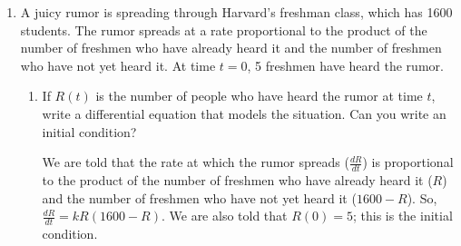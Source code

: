 \documentclass[main]{subfiles}
\begin{document}
\begin{enumerate}[resume]
\begin{enumerate}
  \item
    \begin{problem}[\stretch{1.5}]
      A student who has learned a fifth of the list already is currently
      learning at a rate of 10\% of the list per day.  Incorporate this
      into your model.
    \end{problem}

    \begin{solution}
      At this particular moment, $L = 20$ (the student has learned 20\% of
      the list) and $\frac{dL}{dt} = 10$ (the student is learning at a
      rate of 10\% per day).  If we plug this into the differential
      equation $\frac{dL}{dt} = k(100 - L)$, then we find that $10 = k
      (100 - 20)$, so we are able to solve for $k$: it's $\frac{10}{80} =
      \frac{1}{8}$.  Thus, $\boxed{\frac{dL}{dt} = \frac{1}{8} (100 -
        L)}$.
    \end{solution}

  \end{enumerate}

\item 


  A juicy rumor is spreading through Harvard's freshman class, which
  has 1600 students.  The rumor spreads at a rate proportional to the
  product of the number of freshmen who have already heard it and the
  number of freshmen who have not yet heard it.  At time $t = 0$, 5
  freshmen have heard the rumor.

  \begin{enumerate}
  \item 
    \begin{problem}[\vfill]
      If $R(t)$ is the number of people who have heard the rumor at time
      $t$, write a differential equation that models the situation.  Can
      you write an initial condition?
    \end{problem}

    \begin{solution}
      We are told that the rate at which the rumor spreads
      ($\frac{dR}{dt}$) is proportional to the product of the number of
      freshmen who have already heard it ($R$) and the number of freshmen
      who have not yet heard it ($1600 - R$).  So, $\boxed{\frac{dR}{dt} =
        kR(1600-R)}$.  We are also told that $\boxed{R(0) = 5}$; this is
      the initial condition.
    \end{solution}


\end{enumerate}
\end{enumerate}
\end{document}
